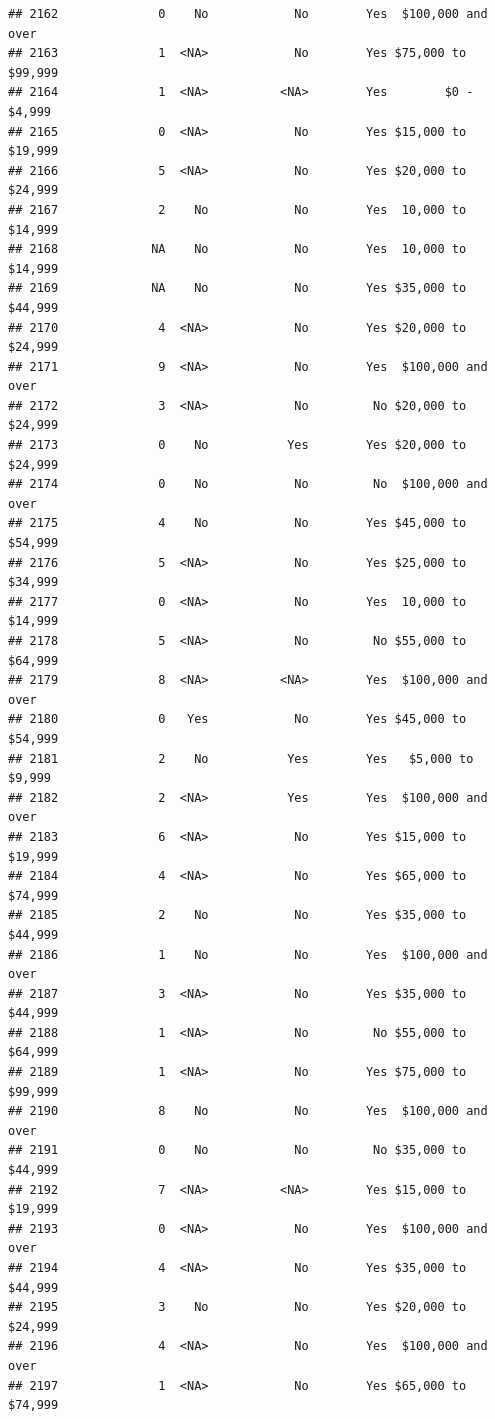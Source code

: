 \documentclass[man]{apa6}
\begin{document}
\begin{verbatim}
## 2162              0    No            No        Yes  $100,000 and over
## 2163              1  <NA>            No        Yes $75,000 to $99,999
## 2164              1  <NA>          <NA>        Yes        $0 - $4,999
## 2165              0  <NA>            No        Yes $15,000 to $19,999
## 2166              5  <NA>            No        Yes $20,000 to $24,999
## 2167              2    No            No        Yes  10,000 to $14,999
## 2168             NA    No            No        Yes  10,000 to $14,999
## 2169             NA    No            No        Yes $35,000 to $44,999
## 2170              4  <NA>            No        Yes $20,000 to $24,999
## 2171              9  <NA>            No        Yes  $100,000 and over
## 2172              3  <NA>            No         No $20,000 to $24,999
## 2173              0    No           Yes        Yes $20,000 to $24,999
## 2174              0    No            No         No  $100,000 and over
## 2175              4    No            No        Yes $45,000 to $54,999
## 2176              5  <NA>            No        Yes $25,000 to $34,999
## 2177              0  <NA>            No        Yes  10,000 to $14,999
## 2178              5  <NA>            No         No $55,000 to $64,999
## 2179              8  <NA>          <NA>        Yes  $100,000 and over
## 2180              0   Yes            No        Yes $45,000 to $54,999
## 2181              2    No           Yes        Yes   $5,000 to $9,999
## 2182              2  <NA>           Yes        Yes  $100,000 and over
## 2183              6  <NA>            No        Yes $15,000 to $19,999
## 2184              4  <NA>            No        Yes $65,000 to $74,999
## 2185              2    No            No        Yes $35,000 to $44,999
## 2186              1    No            No        Yes  $100,000 and over
## 2187              3  <NA>            No        Yes $35,000 to $44,999
## 2188              1  <NA>            No         No $55,000 to $64,999
## 2189              1  <NA>            No        Yes $75,000 to $99,999
## 2190              8    No            No        Yes  $100,000 and over
## 2191              0    No            No         No $35,000 to $44,999
## 2192              7  <NA>          <NA>        Yes $15,000 to $19,999
## 2193              0  <NA>            No        Yes  $100,000 and over
## 2194              4  <NA>            No        Yes $35,000 to $44,999
## 2195              3    No            No        Yes $20,000 to $24,999
## 2196              4  <NA>            No        Yes  $100,000 and over
## 2197              1  <NA>            No        Yes $65,000 to $74,999

\end{verbatim}
\end{document}
